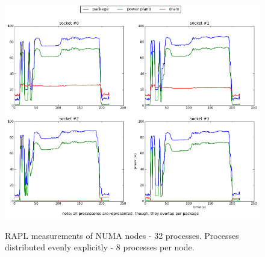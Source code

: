 \begin{figure}[h!]
  \centering
    \includegraphics[width=150mm]{"img/numa/32proc_explicitly_distributed"}
    \label{fig:nf_ss}
    \caption{RAPL measurements of NUMA nodes - 32 processes. Processes 
distributed evenly explicitly - 8 processes per node. }
\end{figure}

